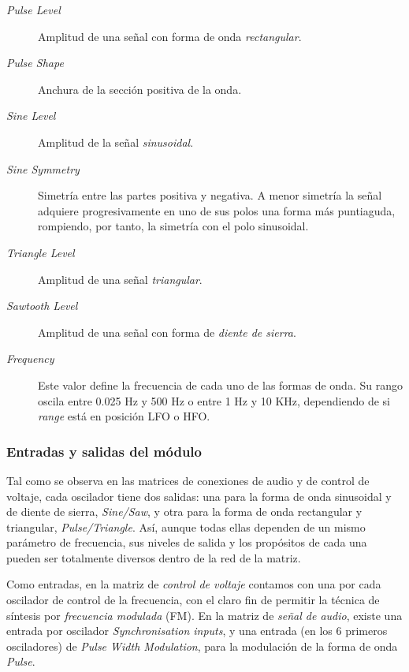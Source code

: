\begin{description}
	\item[\textit{Pulse Level}] Amplitud de una señal con forma de onda \textit{rectangular}. 
	\item[\textit{Pulse Shape}] Anchura de la sección positiva de la onda. 
	\item[\textit{Sine Level}] Amplitud de la señal \textit{sinusoidal}.
	\item[\textit{Sine Symmetry}] Simetría entre las partes positiva y negativa. A menor simetría la señal adquiere progresivamente en uno de sus polos una forma más puntiaguda, rompiendo, por tanto, la simetría con el polo sinusoidal. 
	\item[\textit{Triangle Level}] Amplitud de una señal \textit{triangular}.
	\item[\textit{Sawtooth Level}] Amplitud de una señal con forma de \textit{diente de sierra}.
	\item[\textit{Frequency}] Este valor define la frecuencia de cada uno de las formas de onda. Su rango oscila entre 0.025 Hz y 500 Hz o entre 1 Hz y 10 KHz, dependiendo de si \textit{range} está en posición LFO o HFO.  
\end{description}

\subsubsection{Entradas y salidas del módulo}
Tal como se observa en las matrices de conexiones de audio y de control de voltaje, cada oscilador tiene dos salidas: una para la forma de onda sinusoidal y de diente de sierra, \textit{Sine/Saw}, y otra para la forma de onda rectangular y triangular, \textit{Pulse/Triangle}. Así, aunque todas ellas dependen de un mismo parámetro de frecuencia, sus niveles de salida y los propósitos de cada una pueden ser totalmente diversos dentro de la red de la matriz. 

Como entradas, en la matriz de \textit{control de voltaje} contamos con una por cada oscilador de control de la frecuencia, con el claro fin de permitir la técnica de síntesis por \textit{frecuencia modulada} (FM). En la matriz de \textit{señal de audio}, existe una entrada por oscilador \textit{Synchronisation inputs}, y una entrada (en los 6 primeros osciladores) de \textit{Pulse Width Modulation}, para la modulación de la forma de onda \textit{Pulse}.

